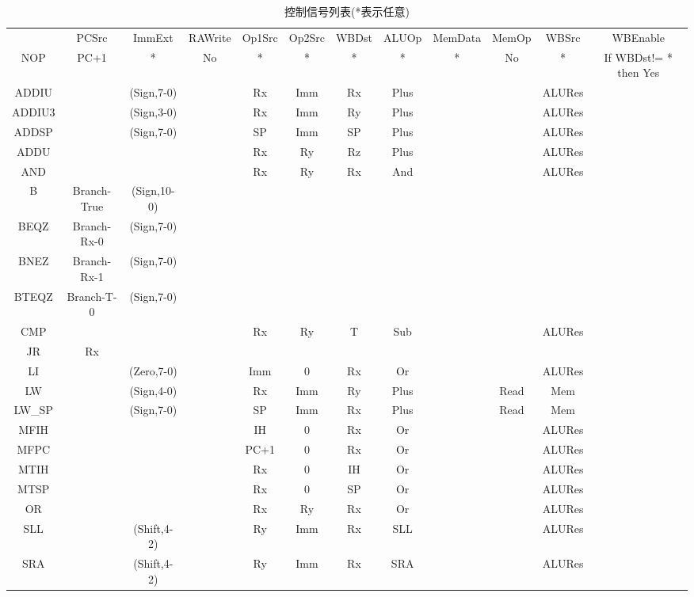 \documentclass{article}
\begin{document}
\begin{table}
\caption{控制信号列表(*表示任意)}
\vspace{2mm}
\begin{adjustbox}{max width=\textwidth}
\label{tb:control}
\begin{tabular}[h]{c|c|c|c|c|c|c|c|c|c|c|c}
& PCSrc & ImmExt & RAWrite & Op1Src & Op2Src & WBDst & ALUOp & MemData & MemOp & WBSrc & WBEnable\\
NOP & PC+1 & * & No & * & * & * & * & * & No & * & If WBDst!= * then Yes\\
ADDIU &  & (Sign,7-0) &  & Rx & Imm & Rx & Plus &  &  & ALURes & \\
ADDIU3 &  & (Sign,3-0) &  & Rx & Imm & Ry & Plus &  &  & ALURes & \\
ADDSP &  & (Sign,7-0) &  & SP & Imm & SP & Plus &  &  & ALURes & \\
ADDU &  &  &  & Rx & Ry & Rz & Plus &  &  & ALURes & \\
AND &  &  &  & Rx & Ry & Rx & And &  &  & ALURes & \\
B & Branch-True & (Sign,10-0) &  &  &  &  &  &  &  &  & \\
BEQZ & Branch-Rx-0 & (Sign,7-0) &  &  &  &  &  &  &  &  & \\
BNEZ & Branch-Rx-1 & (Sign,7-0) &  &  &  &  &  &  &  &  & \\
BTEQZ & Branch-T-0 & (Sign,7-0) &  &  &  &  &  &  &  &  & \\
CMP &  &  &  & Rx & Ry & T & Sub &  &  & ALURes & \\
JR & Rx &  &  &  &  &  &  &  &  &  & \\
LI &  & (Zero,7-0) &  & Imm & 0 & Rx & Or &  &  & ALURes & \\
LW &  & (Sign,4-0) &  & Rx & Imm & Ry & Plus &  & Read & Mem & \\
LW\_SP &  & (Sign,7-0) &  & SP & Imm & Rx & Plus &  & Read & Mem & \\
MFIH &  &  &  & IH & 0 & Rx & Or &  &  & ALURes & \\
MFPC &  &  &  & PC+1 & 0 & Rx & Or &  &  & ALURes & \\
MTIH &  &  &  & Rx & 0 & IH & Or &  &  & ALURes & \\
MTSP &  &  &  & Rx & 0 & SP & Or &  &  & ALURes & \\
OR &  &  &  & Rx & Ry & Rx & Or &  &  & ALURes & \\
SLL &  & (Shift,4-2) &  & Ry & Imm & Rx & SLL &  &  & ALURes & \\
SRA &  & (Shift,4-2) &  & Ry & Imm & Rx & SRA &  &  & ALURes & \\

\end{tabular}
\end{adjustbox}
\end{table}
\end{document}
